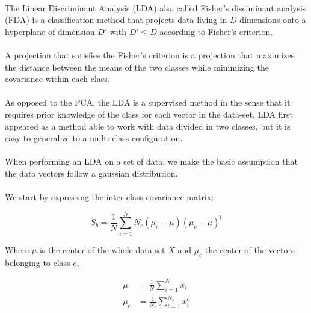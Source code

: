 
\paragraph{}
The Linear Discriminant Analysis (LDA) also called Fisher's disciminant analysis (FDA) is a classification method that projects data living in $D$ dimensions onto a hyperplane of dimension $D'$ with $D' \leq D$ according to Fisher's criterion. 

\paragraph{}
A projection that satisfies the Fisher's criterion is a projection that maximizes the distance between the means of the two classes while minimizing the covariance within each class.

\paragraph{}
As opposed to the PCA, the LDA is a supervised method in the sense that it requires prior
knowledge of the class for each vector in the data-set. LDA first appeared as a method able to work with data
divided in two classes, but it is easy to generalize to a multi-class configuration.

\paragraph{}
When performing an LDA on a set of data, we make the basic assumption that the data vectors follow a
gaussian distribution.

\paragraph{}
We start by expressing the inter-class covariance matrix:

\begin{equation*}
S_b = \frac{1}{N}\sum_{i = 1}^N N_c(\mu_c - \mu)(\mu_c - \mu)^t
\end{equation*}

Where $\mu$ is the center of the whole data-set $X$ and $\mu_c$ the center of the vectors belonging to
class $c$,

\begin{align*}
\mu &= \frac{1}{N}\sum_{i = 1}^{N} x_i \\
\mu_c &= \frac{1}{N_c}\sum_{i = 1}^{N_k} x_i^c
\end{align*}


